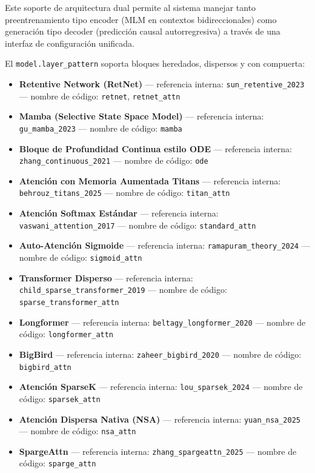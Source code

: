 \documentclass[11pt,a4paper]{article}
\begin{document}
Este soporte de arquitectura dual permite al sistema manejar tanto preentrenamiento tipo encoder (MLM en contextos bidireccionales) como generación tipo decoder (predicción causal autorregresiva) a través de una interfaz de configuración unificada.

El \texttt{model.layer\_pattern} soporta bloques heredados, dispersos y con compuerta:
\begin{itemize}[leftmargin=*]
    \item \textbf{Retentive Network (RetNet)} --- referencia interna: \texttt{sun\_retentive\_2023} --- nombre de código: \texttt{retnet}, \texttt{retnet\_attn}
    \item \textbf{Mamba (Selective State Space Model)} --- referencia interna: \texttt{gu\_mamba\_2023} --- nombre de código: \texttt{mamba}
    \item \textbf{Bloque de Profundidad Continua estilo ODE} --- referencia interna: \texttt{zhang\_continuous\_2021} --- nombre de código: \texttt{ode}
    \item \textbf{Atención con Memoria Aumentada Titans} --- referencia interna: \texttt{behrouz\_titans\_2025} --- nombre de código: \texttt{titan\_attn}
    \item \textbf{Atención Softmax Estándar} --- referencia interna: \texttt{vaswani\_attention\_2017} --- nombre de código: \texttt{standard\_attn}
    \item \textbf{Auto-Atención Sigmoide} --- referencia interna: \texttt{ramapuram\_theory\_2024} --- nombre de código: \texttt{sigmoid\_attn}
    \item \textbf{Transformer Disperso} --- referencia interna: \texttt{child\_sparse\_transformer\_2019} --- nombre de código: \texttt{sparse\_transformer\_attn}
    \item \textbf{Longformer} --- referencia interna: \texttt{beltagy\_longformer\_2020} --- nombre de código: \texttt{longformer\_attn}
    \item \textbf{BigBird} --- referencia interna: \texttt{zaheer\_bigbird\_2020} --- nombre de código: \texttt{bigbird\_attn}
    \item \textbf{Atención SparseK} --- referencia interna: \texttt{lou\_sparsek\_2024} --- nombre de código: \texttt{sparsek\_attn}
    \item \textbf{Atención Dispersa Nativa (NSA)} --- referencia interna: \texttt{yuan\_nsa\_2025} --- nombre de código: \texttt{nsa\_attn}
    \item \textbf{SpargeAttn} --- referencia interna: \texttt{zhang\_spargeattn\_2025} --- nombre de código: \texttt{sparge\_attn}

\end{itemize}
\end{document}
